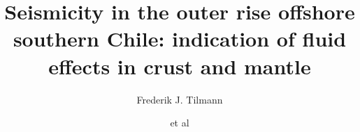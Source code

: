 \documentclass[reviewcopy]{elsarticle}
\begin{document}
\begin{frontmatter}



\title{Seismicity in the outer rise offshore southern Chile:
  indication of fluid effects in crust and mantle}


\author[cam]{Frederik J. Tilmann}
\author[ifm,ham]{et al}

\address[cam]{Bullard Laboratories, University of Cambridge,
  Cambridge CB3 0EZ, UK}
\address[ifm]{IfM-GEOMAR, Kiel, Germany}
\address[ham]{Institute for Geophysics, University of Hamburg, Hamburg, Germany}

\begin{abstract}



\end{abstract}
\end{frontmatter}
\end{document}
